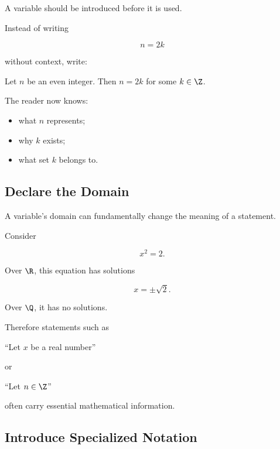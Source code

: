 A variable should be introduced before it is used.

Instead of writing

\[ n=2k \]

without context, write:

\begin{center}
Let \(n\) be an even integer. Then \(n=2k\) for some \(k\in\Z\).
\end{center}

The reader now knows:

\begin{itemize}
    \item what \(n\) represents;
    \item why \(k\) exists;
    \item what set \(k\) belongs to.
\end{itemize}

\subsection{Declare the Domain}
\label{subsec:declare-domain}

A variable's domain can fundamentally change the meaning of a statement.

Consider

\[ x^2=2. \]

Over \(\R\), this equation has solutions

\[ x=\pm\sqrt2. \]

Over \(\Q\), it has no solutions.

Therefore statements such as

\begin{center}
``Let \(x\) be a real number''
\end{center}

or

\begin{center}
``Let \(n\in\Z\)''
\end{center}

often carry essential mathematical information.

\subsection{Introduce Specialized Notation}
\label{subsec:introduce-specialized-notation}

